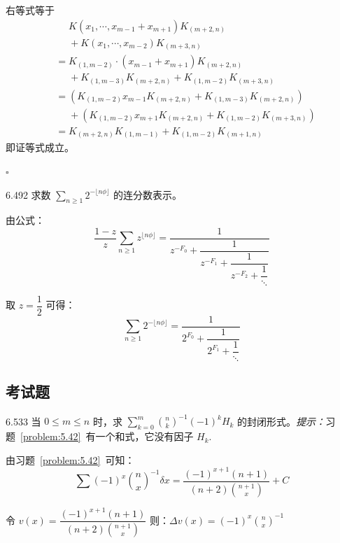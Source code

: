 右等式等于
\begin{align*}
  &\phantom{=} K (x_1, \cdots, x_{m-1} + x_{m+1}) K_{(m+2, n)} \\
  &\phantom{=} + K(x_1, \cdots, x_{m-2}) K_{(m+3, n)} \\
  &= K_{(1, m-2)} \cdot (x_{m-1} + x_{m+1}) K_{(m+2, n)} \\
  &\phantom{=} + K_{(1, m-3)} K_{(m+2, n)} + K_{(1, m-2)} K_{(m+3, n)} \\
  &= (K_{(1, m-2)} x_{m-1} K_{(m+2, n)} + K_{(1, m-3)} K_{(m+2, n)}) \\
  &\phantom{=} + (K_{(1, m-2)} x_{m+1} K_{(m+2, n)} + K_{(1, m-2)} K_{(m+3, n)}) \\
  &= K_{(m+2, n)} K_{(1, m-1)} + K_{(1, m-2)} K_{(m+1, n)}
\end{align*}
即证等式成立。

\hfill \( \square \)

\begin{problem}{6.49}{2}
  求数 \( \sum_{n \geqslant 1} 2 ^{- \lfloor n \phi \rfloor} \) 的连分数表示。
\end{problem}

由公式：
\[
  \boxed{\dfrac{1-z}{z} \sum_{n \geqslant 1} z^{\lfloor n \phi \rfloor} = \dfrac{1}{z^{-F_0} + \dfrac{1}{z^{-F_1} + \dfrac{1}{z^{-F_2} + \dfrac{1}{\ddots}}}}}
\]

取 \( z = \dfrac{1}{2} \) 可得：
\[
  \sum_{n \geqslant 1} 2 ^{- \lfloor n \phi \rfloor} = \dfrac{1}{2^{F_0} + \dfrac{1}{2^{F_1} + \dfrac{1}{\ddots}}}
\]

\subsection{考试题}

\begin{problem}{6.53}{3}
  当 \( 0 \leqslant m \leqslant n \) 时，求 \( \displaystyle\sum_{k=0}^m \binom{n}{k}^{-1} (-1)^k H_k \) 的封闭形式。\textit{提示：}习题~\ref{problem:5.42}~有一个和式，它没有因子 \( H_k \).
\end{problem}

由习题~\ref{problem:5.42}~可知：
\[
  \boxed{\displaystyle\sum (-1)^x \binom{n}{x}^{-1} \delta x = \dfrac{(-1)^{x+1} (n+1)}{(n+2) \binom{n+1}{x}} + C}
\]

令 \( v(x) = \dfrac{(-1)^{x+1} (n+1)}{(n+2) \binom{n+1}{x}} \) 则：\( \displaystyle\Delta v(x) = (-1)^x \binom{n}{x}^{-1} \)

